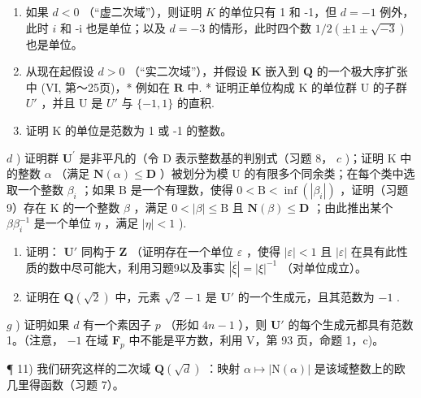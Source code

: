\begin{enumerate}
\def\labelenumi{\alph{enumi})}
\item
  如果 \(d < 0\) （“虚二次域”），则证明 \(K\) 的单位只有 1 和 -1，但 \(d = -1\) 例外，此时 \(i\) 和 -i 也是单位；以及 \(d = -3\) 的情形，此时四个数 \(1/2(\pm 1 \pm \sqrt{-3})\) 也是单位。
\item
  从现在起假设 \(d > 0\) （“实二次域”），并假设 \(\mathbf{K}\) 嵌入到 \(\mathbf{Q}\) 的一个极大序扩张中 (VI, 第～25页)，* 例如在 \(\mathbf{R}\) 中. * 证明正单位构成 K 的单位群 U 的子群 \(U'\) ，并且 U 是 \(U'\) 与 \(\{-1,1\}\) 的直积.
\item
  证明 K 的单位是范数为 1 或 -1 的整数。
\end{enumerate}

\(d\) ) 证明群 \(\mathbf{U}^{\prime}\) 是非平凡的（令 D 表示整数基的判别式（习题 8， \(c\) )；证明 K 中的整数 \(\alpha\) （满足 \(\mathbf{N}(\alpha)\leqslant \mathbf{D}\) ）被划分为模 U 的有限多个同余类；在每个类中选取一个整数 \(\beta_{i}\) ；如果 B 是一个有理数，使得 \(0 < \mathrm{B} < \inf (|\beta_i|)\) ，证明（习题9）存在 K 的一个整数 \(\beta\) ，满足 \(0 < |\beta |\leqslant \mathrm{B}\) 且 \(\mathbf{N}(\beta)\leqslant \mathbf{D}\) ；由此推出某个 \(\beta \beta_{i}^{-1}\) 是一个单位 \(\eta\) ，满足 \(|\eta| < 1\) ).

\begin{enumerate}
\def\labelenumi{\alph{enumi})}
\setcounter{enumi}{4}
\item
  证明： \(\mathbf{U}'\) 同构于 \(\mathbf{Z}\) （证明存在一个单位 \(\varepsilon\) ，使得 \(|\varepsilon| < 1\) 且 \(|\varepsilon|\) 在具有此性质的数中尽可能大，利用习题9以及事实 \(|\overline{\xi}| = |\xi|^{-1}\) （对单位成立）。
\item
  证明在 \(\mathbf{Q}(\sqrt{2})\) 中，元素 \(\sqrt{2} - 1\) 是 \(\mathbf{U}'\) 的一个生成元，且其范数为 \(-1\) .
\end{enumerate}

\(g\) ) 证明如果 \(d\) 有一个素因子 \(p\) （形如 \(4n - 1\) ），则 \(\mathbf{U}'\) 的每个生成元都具有范数 1。（注意， \(-1\) 在域 \(\mathbf{F}_p\) 中不能是平方数，利用 V，第 93 页，命题 1，c)。

¶ 11) 我们研究这样的二次域 \(\mathbf{Q}(\sqrt{d})\) ：映射 \(\alpha \mapsto |\mathrm{N}(\alpha)|\) 是该域整数上的欧几里得函数（习题 7）。


